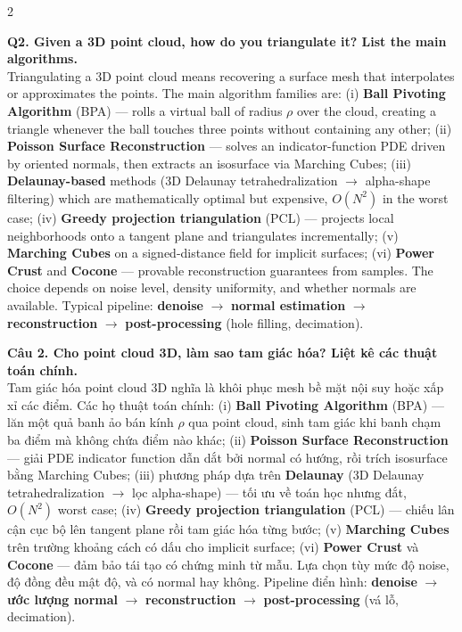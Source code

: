 \begin{paracol}{2}
\switchcolumn*

\textbf{Q2. Given a 3D point cloud, how do you triangulate it? List the main algorithms.}\\
Triangulating a 3D point cloud means recovering a surface mesh that interpolates or approximates the points. The main algorithm families are: (i) \textbf{Ball Pivoting Algorithm} (BPA) — rolls a virtual ball of radius $\rho$ over the cloud, creating a triangle whenever the ball touches three points without containing any other; (ii) \textbf{Poisson Surface Reconstruction} — solves an indicator-function PDE driven by oriented normals, then extracts an isosurface via Marching Cubes; (iii) \textbf{Delaunay-based} methods (3D Delaunay tetrahedralization $\to$ alpha-shape filtering) which are mathematically optimal but expensive, $O(N^2)$ in the worst case; (iv) \textbf{Greedy projection triangulation} (PCL) — projects local neighborhoods onto a tangent plane and triangulates incrementally; (v) \textbf{Marching Cubes} on a signed-distance field for implicit surfaces; (vi) \textbf{Power Crust} and \textbf{Cocone} — provable reconstruction guarantees from samples. The choice depends on noise level, density uniformity, and whether normals are available. Typical pipeline: \textbf{denoise} $\to$ \textbf{normal estimation} $\to$ \textbf{reconstruction} $\to$ \textbf{post-processing} (hole filling, decimation).

\switchcolumn

\textbf{Câu 2. Cho point cloud 3D, làm sao tam giác hóa? Liệt kê các thuật toán chính.}\\
Tam giác hóa point cloud 3D nghĩa là khôi phục mesh bề mặt nội suy hoặc xấp xỉ các điểm. Các họ thuật toán chính: (i) \textbf{Ball Pivoting Algorithm} (BPA) — lăn một quả banh ảo bán kính $\rho$ qua point cloud, sinh tam giác khi banh chạm ba điểm mà không chứa điểm nào khác; (ii) \textbf{Poisson Surface Reconstruction} — giải PDE indicator function dẫn dắt bởi normal có hướng, rồi trích isosurface bằng Marching Cubes; (iii) phương pháp dựa trên \textbf{Delaunay} (3D Delaunay tetrahedralization $\to$ lọc alpha-shape) — tối ưu về toán học nhưng đắt, $O(N^2)$ worst case; (iv) \textbf{Greedy projection triangulation} (PCL) — chiếu lân cận cục bộ lên tangent plane rồi tam giác hóa từng bước; (v) \textbf{Marching Cubes} trên trường khoảng cách có dấu cho implicit surface; (vi) \textbf{Power Crust} và \textbf{Cocone} — đảm bảo tái tạo có chứng minh từ mẫu. Lựa chọn tùy mức độ noise, độ đồng đều mật độ, và có normal hay không. Pipeline điển hình: \textbf{denoise} $\to$ \textbf{ước lượng normal} $\to$ \textbf{reconstruction} $\to$ \textbf{post-processing} (vá lỗ, decimation).


\end{paracol}
